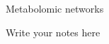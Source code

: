 \documentclass[aspectratio=169]{beamer}
\begin{document}
\begin{frame}{Metabolomic networks}

        \begin{note}
            {Write your notes here}
        \end{note}
    \end{frame}
\end{document}
